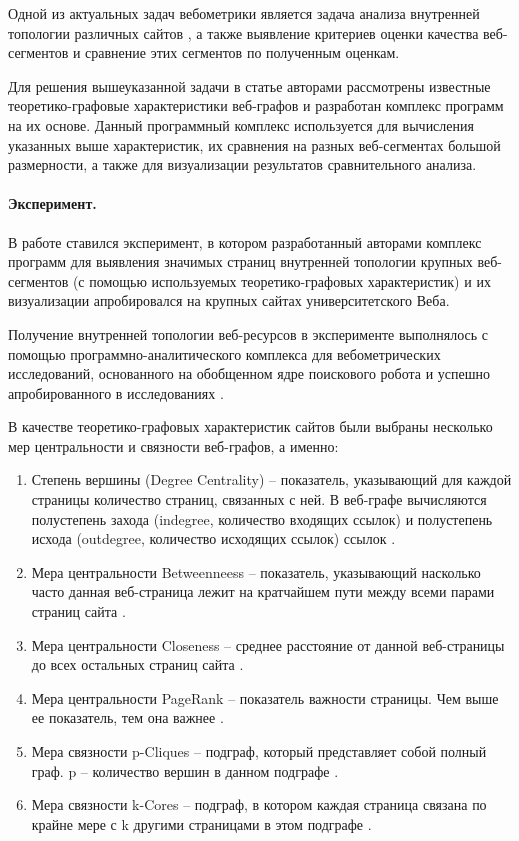 Одной из актуальных задач вебометрики является задача анализа внутренней топологии различных сайтов \cite{Thelwall,BlekanovSergeevMaksimov,MaksimovBlekanov,BlekanovSergeevMaksimovBOWTIE}, а также выявление критериев оценки качества веб-сегментов и сравнение этих сегментов по полученным оценкам.  

Для решения вышеуказанной задачи в статье авторами рассмотрены известные теоретико-графовые характеристики веб-графов и разработан комплекс программ на их основе. Данный программный комплекс используется для вычисления указанных выше характеристик, их сравнения на разных веб-сегментах большой размерности, а также для визуализации результатов сравнительного анализа.  

\paragraph{Эксперимент.} В работе ставился эксперимент, в котором разработанный авторами комплекс программ для выявления значимых страниц внутренней топологии крупных веб-сегментов (с помощью используемых теоретико-графовых характеристик) и их визуализации апробировался на крупных сайтах университетского Веба. 

Получение внутренней топологии веб-ресурсов в эксперименте выполнялось с помощью программно-аналитического комплекса для вебометрических исследований, основанного на обобщенном ядре поискового робота \cite{BlekanovSergeevMartynenko} и успешно апробированного в исследованиях \cite{BlekanovSergeevMaksimov,MaksimovBlekanov,BlekanovSergeevMaksimovBOWTIE}.

В качестве теоретико-графовых характеристик сайтов были выбраны несколько мер центральности и связности веб-графов, а именно:
\begin{enumerate}
	\item Степень вершины (Degree Centrality) -- показатель, указывающий для каждой страницы количество страниц, связанных с ней. В веб-графе вычисляются полустепень захода (indegree, количество входящих ссылок) и полустепень исхода (outdegree, количество исходящих ссылок) ссылок \cite{WassermanFaust,OrtegaAguillo}.
		\item Мера центральности Betweenneess -- показатель, указывающий насколько часто данная веб-страница лежит на кратчайшем пути между всеми парами страниц сайта \cite{WassermanFaust,OrtegaAguillo}.
		\item Мера центральности Closeness -- среднее расстояние от данной веб-страницы до всех остальных страниц сайта \cite{WassermanFaust}.
		\item Мера центральности PageRank -- показатель важности страницы. Чем выше ее показатель, тем она важнее \cite{PageBrinMotwani}.
		\item Мера связности p-Cliques -- подграф, который представляет собой полный граф. p -- количество вершин в данном подграфе \cite{OrtegaAguillo}.
		\item Мера связности k-Cores -- подграф, в котором каждая страница связана по крайне мере с k другими страницами в этом подграфе \cite{OrtegaAguillo}.
\end{enumerate}

